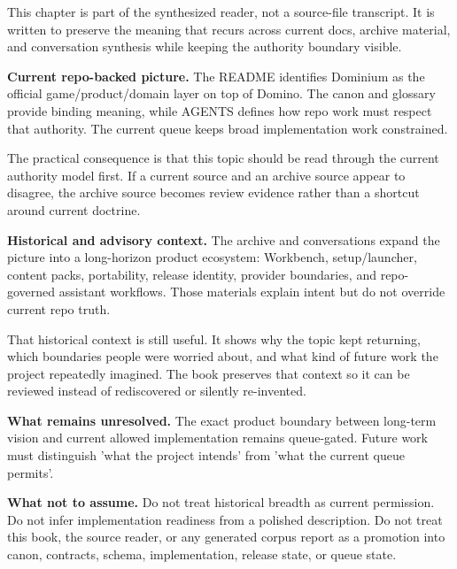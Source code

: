 \documentclass[10.5pt,a4paper,openany]{book}
\begin{document}
This chapter is part of the synthesized reader, not a source-\allowbreak{}file transcript.\allowbreak{} It is written to preserve the meaning that recurs across current docs, archive material, and conversation synthesis while keeping the authority boundary visible.\allowbreak{}


\textbf{Current repo-backed picture.} The README identifies Dominium as the official game/\allowbreak{}product/\allowbreak{}domain layer on top of Domino.\allowbreak{} The canon and glossary provide binding meaning, while AGENTS defines how repo work must respect that authority.\allowbreak{} The current queue keeps broad implementation work constrained.\allowbreak{}


The practical consequence is that this topic should be read through the current authority model first.\allowbreak{} If a current source and an archive source appear to disagree, the archive source becomes review evidence rather than a shortcut around current doctrine.\allowbreak{}


\textbf{Historical and advisory context.} The archive and conversations expand the picture into a long-\allowbreak{}horizon product ecosystem: Workbench, setup/\allowbreak{}launcher, content packs, portability, release identity, provider boundaries, and repo-\allowbreak{}governed assistant workflows.\allowbreak{} Those materials explain intent but do not override current repo truth.\allowbreak{}


That historical context is still useful.\allowbreak{} It shows why the topic kept returning, which boundaries people were worried about, and what kind of future work the project repeatedly imagined.\allowbreak{} The book preserves that context so it can be reviewed instead of rediscovered or silently re-\allowbreak{}invented.\allowbreak{}


\textbf{What remains unresolved.} The exact product boundary between long-\allowbreak{}term vision and current allowed implementation remains queue-\allowbreak{}gated.\allowbreak{} Future work must distinguish 'what the project intends' from 'what the current queue permits'.\allowbreak{}


\textbf{What not to assume.} Do not treat historical breadth as current permission.\allowbreak{} Do not infer implementation readiness from a polished description.\allowbreak{} Do not treat this book, the source reader, or any generated corpus report as a promotion into canon, contracts, schema, implementation, release state, or queue state.\allowbreak{}
\end{document}
